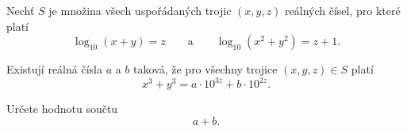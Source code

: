 \begin{exercise}
    Nechť $S$ je množina všech uspořádaných trojic $(x,y,z)$ reálných čísel, pro které platí
    \[
        \log_{10}(x + y) = z
        \qquad\text{a}\qquad
        \log_{10}(x^{2} + y^{2}) = z + 1.
    \]

    Existují reálná čísla $a$ a $b$ taková, že pro všechny trojice $(x,y,z) \in S$ platí
    \[
        x^{3} + y^{3} = a \cdot 10^{3z} + b \cdot 10^{2z}.
    \]

    Určete hodnotu součtu
    \[
        a + b.
    \]
\end{exercise}